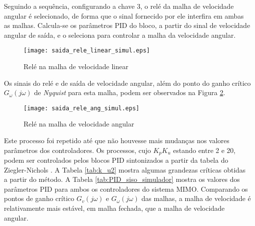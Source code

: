 Seguindo a sequência, configurando a chave 3, o relé da malha de velocidade angular é selecionado, de forma que o sinal fornecido por ele interfira em ambas as malhas. Calcula-se os parâmetros PID do bloco, a partir do sinal de velocidade angular de saída, e o seleciona para controlar a malha da velocidade angular. 

\begin{figure}[!htb]
	\caption{\label{fig:teste_rele_seq1}Relé na malha de velocidade linear}
	\begin{center}
		\texttt{[image: saida\_rele\_linear\_simul.eps]}
	\end{center}
\end{figure}

Os sinais do relé e de saída de velocidade angular, além do ponto do ganho crítico $G_\omega(j\omega)$ de \emph{Nyquist} para esta malha, podem ser observados na Figura \ref{fig:teste_rele_seq2}.

\begin{figure}[!htb]
	\caption{\label{fig:teste_rele_seq2}Relé na malha de velocidade angular}
	\begin{center}
		\texttt{[image: saida\_rele\_ang\_simul.eps]}
	\end{center}
\end{figure}

Este processo foi repetido até que não houvesse mais mudanças nos valores parâmetros dos controladores. Os processos, cujo $K_pK_u$ estando entre 2 e 20, podem ser controlados pelos blocos PID sintonizados a partir da tabela do Ziegler-Nichols \cite{COELHO:2015}. A Tabela \ref{tab:k_u2} mostra algumas grandezas críticas obtidas a partir do método. A Tabela \ref{tab:PID_siso_simulador} mostra os valores dos parâmetros PID para ambos os controladores do sistema MIMO. Comparando os pontos de ganho crítico $G_v(j\omega)$ e $G_\omega(j\omega)$ das malhas, a malha de velocidade é relativamente mais estável, em malha fechada, que a malha de velocidade angular.

